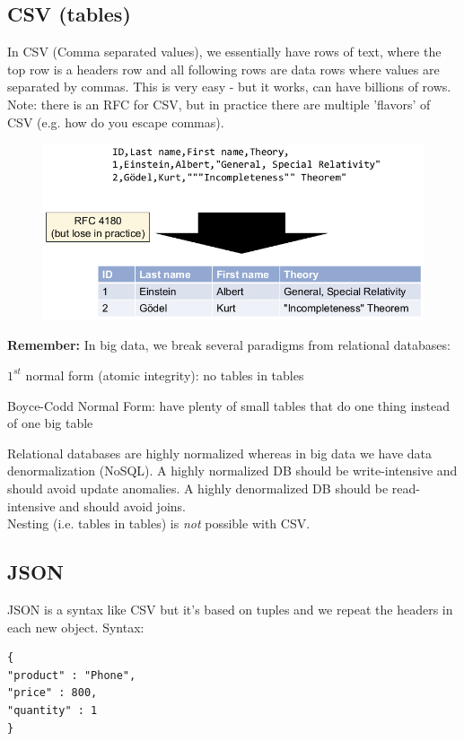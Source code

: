 \documentclass[11pt,oneside,a4paper]{article}
\begin{document}
\subsection{CSV (tables)}

In CSV (Comma separated values), we essentially have rows of text, where the top row is a headers row and all following rows are data rows where values are separated by commas. This is very easy - but it works, can have billions of rows. Note: there is an RFC for CSV, but in practice there are multiple 'flavors' of CSV (e.g. how do you escape commas).

\begin{figure}[hb!]
	\centering
	\includegraphics[width=0.4\linewidth]{figures/csv}
	\label{fig:csv}
\end{figure}

\textbf{Remember:} In big data, we break several paradigms from relational databases:

\begin{compactitem}
	\item $1^{st}$ normal form (atomic integrity): no tables in tables
	\item Boyce-Codd Normal Form: have plenty of small tables that do one thing instead of one big table
\end{compactitem}

Relational databases are highly normalized whereas in big data we have data denormalization (NoSQL). A highly normalized DB should be write-intensive and should avoid update anomalies. A highly denormalized DB should be read-intensive and should avoid joins.\\
Nesting (i.e. tables in tables) is \textit{not} possible with CSV.

\subsection{JSON}

JSON is a syntax like CSV but it's based on tuples and we repeat the headers in each new object. Syntax:

\vspace{-\topsep}
\begin{verbatim}
{
"product" : "Phone",
"price" : 800,
"quantity" : 1
}
\end{verbatim}
\vspace{-\topsep}
\end{document}
